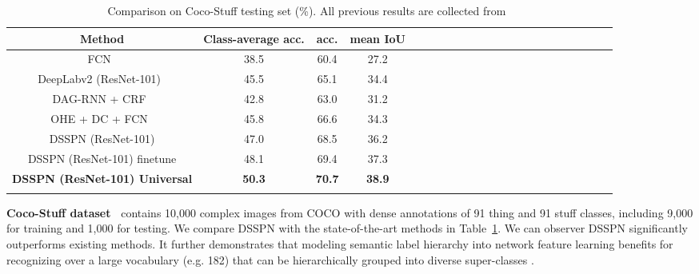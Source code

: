 \documentclass[10pt,twocolumn,letterpaper]{article}
\begin{document}
\begin{table}[!tp]\setlength{\tabcolsep}{2pt}
	\centering\footnotesize{\caption{ Comparison on Coco-Stuff testing set (\%). All previous results are collected from~\cite{caesar2016coco}}\label{tab:coco}
	\begin{tabular}{cccccccccccccccccccccc}
		\toprule
		{Method} & Class-average acc. &  acc. & mean IoU \\
		\midrule
        FCN~\cite{long2015fully} & 38.5 & 60.4 & 27.2\\
        DeepLabv2 (ResNet-101)~\cite{chen2016deeplab} & 45.5 & 65.1 & 34.4\\
		DAG-RNN + CRF~\cite{shuai2017scene} & 42.8 & 63.0 & 31.2 \\
		OHE + DC + FCN~\cite{hu2017labelbank} & 45.8 & 66.6 & 34.3\\
		\midrule
		{DSSPN (ResNet-101)} & {47.0} & {68.5} & {36.2}\\
		{DSSPN (ResNet-101) finetune} & {48.1} & {69.4} & {37.3} \\
		\textbf{DSSPN (ResNet-101) Universal} & \textbf{50.3} & \textbf{70.7} & \textbf{38.9}\\
		\hline
				\vspace{-5mm}
	\end{tabular}}
\end{table}




\textbf{Coco-Stuff dataset~\cite{caesar2016coco}} contains 10,000 complex images from COCO with dense annotations of 91 thing and 91 stuff classes, including 9,000 for training and 1,000 for testing. We compare DSSPN with the state-of-the-art methods in Table~\ref{tab:coco}. We can observer DSSPN significantly outperforms existing methods. It further demonstrates that modeling semantic label hierarchy into network feature learning benefits for recognizing over a large vocabulary (e.g. 182) that can be hierarchically grouped into diverse super-classes . 
\end{document}
